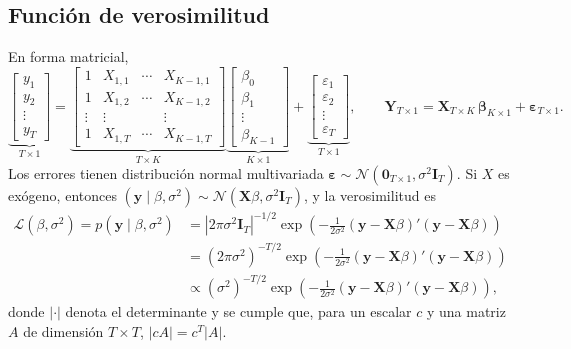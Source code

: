 \documentclass[11pt]{article}
\newcommand{\N}{\mathcal{N}}
\newcommand{\bpar}{\bm{\beta}}
\newcommand{\bX}{\mathbf{X}}
\newcommand{\by}{\mathbf{y}}
\newcommand{\bY}{\mathbf{Y}}
\newcommand{\bI}{\mathbf{I}}
\newcommand{\beps}{\bm{\varepsilon}}
\theoremstyle{definition}
\begin{document}
\subsection{Función de verosimilitud}
En forma matricial,
\[
\underbrace{\begin{bmatrix}y_1\\ y_2\\ \vdots\\ y_T\end{bmatrix}}_{T\times 1}
=
\underbrace{\begin{bmatrix}
1 & X_{1,1} & \cdots & X_{K-1,1}\\
1 & X_{1,2} & \cdots & X_{K-1,2}\\
\vdots & \vdots & & \vdots\\
1 & X_{1,T} & \cdots & X_{K-1,T}
\end{bmatrix}}_{T\times K}
\underbrace{\begin{bmatrix}\beta_0\\ \beta_1\\ \vdots\\ \beta_{K-1}\end{bmatrix}}_{K\times1}
+
\underbrace{\begin{bmatrix}\varepsilon_1\\ \varepsilon_2\\ \vdots\\ \varepsilon_T\end{bmatrix}}_{T\times1},
\qquad
\bY_{T\times1}=\bX_{T\times K}\,\bpar_{K\times1}+\beps_{T\times1}.
\]
Los errores tienen distribución normal multivariada $\beps\sim\N(\mathbf{0}_{T\times1},\sigma^2\bI_T)$. Si $X$ es exógeno, entonces $(\by\mid\beta,\sigma^2)\sim\N(\bX\beta,\sigma^2\bI_T)$, y la verosimilitud es
\begin{align*}
\mathcal{L}(\beta,\sigma^2)=p(\by\mid\beta,\sigma^2)
&=|2\pi\sigma^2\bI_T|^{-1/2}\exp\!\left(-\tfrac{1}{2\sigma^2}(\by-\bX\beta)'(\by-\bX\beta)\right)\\
&=(2\pi\sigma^2)^{-T/2}\exp\!\left(-\tfrac{1}{2\sigma^2}(\by-\bX\beta)'(\by-\bX\beta)\right)\\
&\propto (\sigma^2)^{-T/2}\exp\!\left(-\tfrac{1}{2\sigma^2}(\by-\bX\beta)'(\by-\bX\beta)\right),
\end{align*}
donde $|\cdot|$ denota el determinante y se cumple que, para un escalar $c$ y una matriz $A$ de dimensión $T\times T$, $|cA|=c^{T}|A|$.
\end{document}
